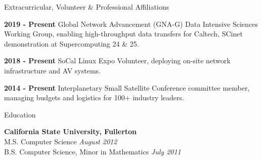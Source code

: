 \documentclass{resume} %
\begin{document}
\renewcommand{\sectionskip}{\vspace{-0.3em}}
\renewcommand{\sectionlineskip}{\smallskip}
\begin{rSection}{ Extracurricular, Volunteer \& Professional Affiliations}
\item {\bf 2019 - Present} Global Network Advancement (GNA-G) Data Intensive Sciences Working Group, enabling high-throughput data transfers for Caltech, SCinet demonstration at Supercomputing 24 \& 25.
\item {\bf 2018 - Present} SoCal Linux Expo Volunteer, deploying on-site network infrastructure and AV systems.
\item {\bf 2014 - Present} Interplanetary Small Satellite Conference committee member, managing budgets and logistics for 100+ industry leaders.
\end{rSection}
\renewcommand{\sectionskip}{\medskip}
\renewcommand{\sectionlineskip}{\medskip}






\renewcommand{\sectionskip}{\vspace{-0.3em}}
\begin{rSection}{Education}
\item {\bf California State University, Fullerton} \\ M.S. Computer Science \hfill {\em August 2012} \\ B.S. Computer Science, Minor in Mathematics \hfill {\em July 2011}
\end{rSection}
\end{document}
